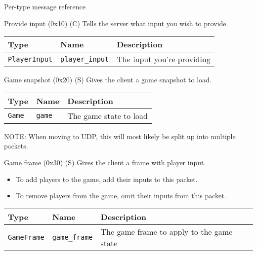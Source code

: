 \documentclass[a4paper,draft]{article}
\begin{document}
\begin{section}{Per-type message reference}
  \begin{subsection}{Provide input (0x10) (C)}
    Tells the server what input you wish to provide.

    \begin{tabular}{lll}
      \hline
      Type & Name & Description \\
      \hline
      \texttt{PlayerInput} & \texttt{player\_input} & The input you're providing \\
      \hline
    \end{tabular}
  \end{subsection}

  \begin{subsection}{Game snapshot (0x20) (S)}
    Gives the client a game snapshot to load.

    \begin{tabular}{lll}
      \hline
      Type & Name & Description \\
      \hline
      \texttt{Game} & \texttt{game} & The game state to load\\
      \hline
    \end{tabular}

    NOTE: When moving to UDP, this will most likely be split up into multiple packets.
  \end{subsection}

  \begin{subsection}{Game frame (0x30) (S)}
    Gives the client a frame with player input.

    \begin{itemize}
      \item To add players to the game, add their inputs to this packet.
      \item To remove players from the game, omit their inputs from this packet.
    \end{itemize}

    \begin{tabular}{lll}
      \hline
      Type & Name & Description \\
      \hline
      \texttt{GameFrame} & \texttt{game\_frame} & The game frame to apply to the game state \\
      \hline
    \end{tabular}

  \end{subsection}
\end{section}
\end{document}
